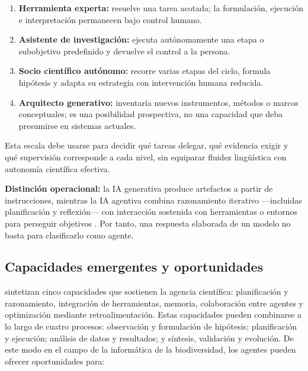 \documentclass[11pt,a4paper]{article}
\begin{document}
\begin{enumerate}
  \item \textbf{Herramienta experta:} resuelve una tarea acotada; la formulación,
  ejecución e interpretación permanecen bajo control humano.
  \item \textbf{Asistente de investigación:} ejecuta autónomamente una etapa o
  subobjetivo predefinido y devuelve el control a la persona.
  \item \textbf{Socio científico autónomo:} recorre varias etapas del ciclo,
  formula hipótesis y adapta su estrategia con intervención humana reducida.
  \item \textbf{Arquitecto generativo:} inventaría nuevos instrumentos, métodos o
  marcos conceptuales; es una posibilidad prospectiva, no una capacidad que deba
  presumirse en sistemas actuales.
\end{enumerate}

Esta escala debe usarse para decidir qué tareas delegar, qué evidencia exigir y
qué supervisión corresponde a cada nivel, sin equiparar fluidez lingüística con
autonomía científica efectiva.

\noindent\textbf{Distinción operacional:} la IA generativa produce artefactos a
partir de instrucciones, mientras la IA agentiva combina razonamiento iterativo
---incluidas planificación y reflexión--- con interacción sostenida con
herramientas o entornos para perseguir objetivos
\citep{schneider2025generative}. Por tanto, una respuesta elaborada de un modelo
no basta para clasificarlo como agente.

\subsection{Capacidades emergentes y oportunidades}

\citet{wei2025agentic} sintetizan cinco capacidades que sostienen la agencia
científica: planificación y razonamiento, integración de herramientas, memoria,
colaboración entre agentes y optimización mediante retroalimentación. Estas
capacidades pueden combinarse a lo largo de cuatro procesos: observación y
formulación de hipótesis; planificación y ejecución; análisis de datos y
resultados; y síntesis, validación y evolución. De este modo en el campo de la
informática de la biodiversidad, los agentes pueden ofrecer oportunidades para:
\end{document}
